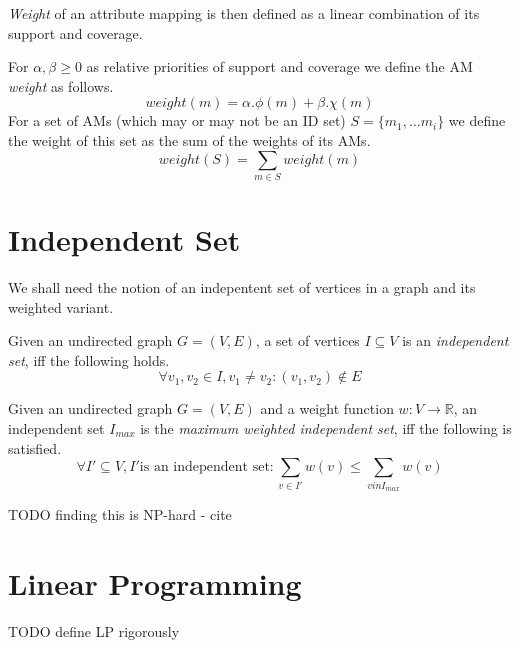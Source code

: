 \textit{Weight} of an attribute mapping is then defined as a linear combination of its support and coverage.

\begin{define}[Weight]
For $\alpha, \beta \geq 0$ as relative priorities of support and coverage we define the AM \textit{weight} as follows.
\[weight(m) = \alpha . \phi(m) + \beta . \chi(m)\]
For a set of AMs (which may or may not be an ID set) $S = \{m_1, \ldots m_i\}$ we define the weight of this set as the sum of the weights of its AMs.
\[weight(S) = \sum_{m \in S} weight(m)\]
\end{define}

\section{Independent Set}

We shall need the notion of an indepentent set of vertices in a graph and its weighted variant.

\begin{define}
Given an undirected graph $G = (V, E)$, a set of vertices $I \subseteq V$ is an \textit{independent set}, iff the following holds.
\[\forall v_1, v_2 \in I, v_1 \neq v_2: (v_1, v_2) \notin E \]
\end{define}

\begin{define}
Given an undirected graph $G = (V, E)$ and a weight function $w: V \rightarrow \mathbb{R}$, an independent set $I_{max}$ is the \textit{maximum weighted independent set}, iff the following is satisfied.
\[\forall I' \subseteq V, I' \text{is an independent set}: \sum_{v \in I'} w(v) \leqslant \sum_{v in I_{max}} w(v)\]
\end{define}

TODO finding this is NP-hard - cite

\section{Linear Programming}

TODO define LP rigorously

